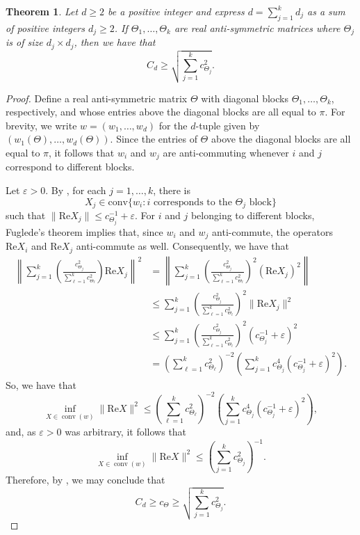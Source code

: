 \documentclass[10pt]{amsart}
\newcommand{\conv}{\operatorname{conv}}
\newtheorem{theorem}{Theorem}[section]
\begin{document}
\begin{theorem}\label{t:uni-dil-lower}
    Let $d\geq 2$ be a positive integer and express $d=\sum_{j=1}^k d_j$ as a sum of positive integers $d_j \geq 2$. If $\Theta_1, \ldots,\Theta_k$ are real anti-symmetric matrices where $\Theta_j$ is of size $d_j\times d_j$, then we have that
    \[
        C_d \geq \sqrt{\sum_{j=1}^k c_{\Theta_j}^2}.
    \]
\end{theorem}

\begin{proof}
    Define a real anti-symmetric matrix $\Theta$ with diagonal blocks $\Theta_1, \ldots, \Theta_k$, respectively, and whose entries above the diagonal blocks are all equal to $\pi$. For brevity, we write $w = (w_1, \ldots, w_d)$ for the $d$-tuple given by $(w_1(\Theta), \ldots, w_d(\Theta))$. Since the entries of $\Theta$ above the diagonal blocks are all equal to $\pi$, it follows that $w_i$ and $w_j$ are anti-commuting whenever $i$ and $j$ correspond to different blocks.

    Let $\varepsilon>0$. By \cite[Theorem 4.4]{gerhold2021dilations}, for each $j=1,\ldots, k$, there is
    \[
        X_j\in\text{conv}\{ w_i : i \text{ corresponds to the $\Theta_j$ block}\}
    \]
    such that $\|\text{Re} X_j\| \leq c_{\Theta_j}^{-1} + \varepsilon$. For $i$ and $j$ belonging to different blocks, Fuglede's theorem implies that, since $w_i$ and $w_j$ anti-commute, the operators $\text{Re}X_i$ and $\text{Re}X_j$ anti-commute as well. Consequently, we have that
    \begin{align*}
        \left\|\sum_{j=1}^k \left( \frac{c_{\Theta_j}^2}{\sum_{\ell=1}^k c_{\Theta_\ell}^2} \right) \text{Re} X_j \right\|^2 & = \left\|\sum_{j=1}^k \left( \frac{c_{\Theta_j}^2}{\sum_{\ell=1}^k c_{\Theta_\ell}^2} \right)^2 (\text{Re} X_j)^2 \right\|\\
        & \leq \sum_{j=1}^k \left( \frac{c_{\Theta_j}^2}{\sum_{\ell=1}^k c_{\Theta_\ell}^2} \right)^2 \|\text{Re} X_j\|^2\\
        & \leq \sum_{j=1}^k \left( \frac{c_{\Theta_j}^2}{\sum_{\ell=1}^k c_{\Theta_\ell}^2} \right)^2 (c_{\Theta_j}^{-1} + \varepsilon)^2\\
        & = \left( \sum_{\ell=1}^k c_{\Theta_\ell}^2\right)^{-2} \left( \sum_{j=1}^k c_{\Theta_j}^4(c_{\Theta_j}^{-1}+\varepsilon)^2\right).
    \end{align*}
    So, we have that
    \[
        \inf_{X\in\conv(w)}\| \text{Re}X\|^2 \leq \left( \sum_{\ell=1}^k c_{\Theta_\ell}^2\right)^{-2} \left( \sum_{j=1}^k c_{\Theta_j}^4(c_{\Theta_j}^{-1}+\varepsilon)^2\right),
    \]
    and, as $\varepsilon>0$ was arbitrary, it follows that
    \[
        \inf_{X\in\conv(w)}\| \text{Re}X\|^2 \leq\left(\sum_{j=1}^k c_{\Theta_j}^2\right)^{-1}.
    \]
    Therefore, by \cite[Theorem 4.4]{gerhold2021dilations}, we may conclude that
    \[
        C_d\geq c_{\Theta} \geq \sqrt{\sum_{j=1}^k c_{\Theta_j}^2}.
    \]
\end{proof}
\end{document}

